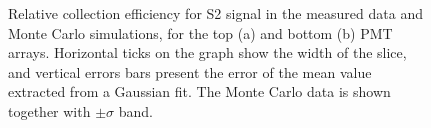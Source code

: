\begin{figure}[!t]
\centering
{}
\caption[Relative collection efficiency for S2 signal in the measured data and Monte Carlo simulations]{Relative collection efficiency for S2 signal in the measured data and Monte Carlo simulations, for the top (a) and bottom (b) PMT arrays. Horizontal ticks on the graph show the width of the slice, and vertical errors bars present the error of the mean value extracted from a Gaussian fit. The Monte Carlo data is shown together with $\pm\sigma$ band.}
\label{figLCEs2}
\end{figure}

